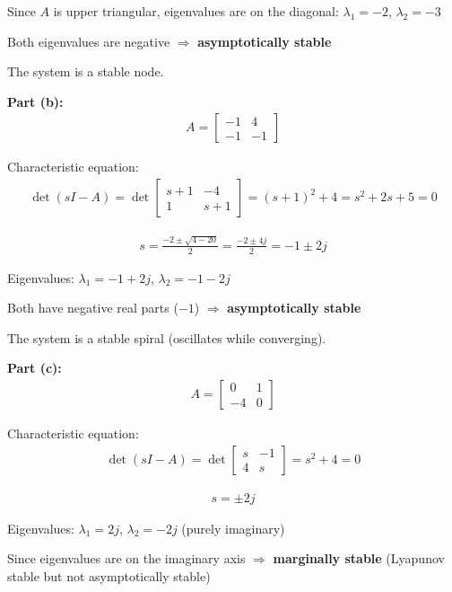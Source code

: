 \documentclass[11pt,a4paper]{article}
\begin{document}
Since $A$ is upper triangular, eigenvalues are on the diagonal: $\lambda_1 = -2$, $\lambda_2 = -3$

Both eigenvalues are negative $\Rightarrow$ \textbf{asymptotically stable}

The system is a stable node.

\textbf{Part (b):}
\begin{align}
  A = \begin{bmatrix} -1 & 4 \\ -1 & -1 \end{bmatrix}
\end{align}

Characteristic equation:
\begin{align}
  \det(sI - A) = \det\begin{bmatrix} s+1 & -4 \\ 1 & s+1 \end{bmatrix} = (s+1)^2 + 4 = s^2 + 2s + 5 = 0
\end{align}

\begin{align}
  s = \frac{-2 \pm \sqrt{4-20}}{2} = \frac{-2 \pm 4j}{2} = -1 \pm 2j
\end{align}

Eigenvalues: $\lambda_1 = -1 + 2j$, $\lambda_2 = -1 - 2j$

Both have negative real parts ($-1$) $\Rightarrow$ \textbf{asymptotically stable}

The system is a stable spiral (oscillates while converging).

\textbf{Part (c):}
\begin{align}
  A = \begin{bmatrix} 0 & 1 \\ -4 & 0 \end{bmatrix}
\end{align}

Characteristic equation:
\begin{align}
  \det(sI - A) = \det\begin{bmatrix} s & -1 \\ 4 & s \end{bmatrix} = s^2 + 4 = 0
\end{align}

\begin{align}
  s = \pm 2j
\end{align}

Eigenvalues: $\lambda_1 = 2j$, $\lambda_2 = -2j$ (purely imaginary)

Since eigenvalues are on the imaginary axis $\Rightarrow$ \textbf{marginally stable} (Lyapunov stable but not asymptotically stable)
\end{document}
